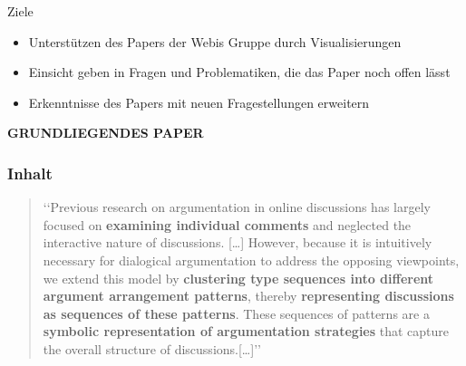 \documentclass[compress,12pt]{beamer}
\begin{document}
    \begin{frame}{Ziele}
        \begin{itemize}
            \item Unterstützen des Papers der Webis Gruppe durch Visualisierungen
            \item Einsicht geben in Fragen und Problematiken, die das Paper noch offen lässt
            \item Erkenntnisse des Papers mit neuen Fragestellungen erweitern
        \end{itemize}
    \end{frame}

    \End


    \begin{frame}
        \centering
        \textbf{GRUNDLIEGENDES PAPER}
    \end{frame}

    \begin{frame}
        \frametitle{Inhalt}
        {\small
            \begin{quote}
                \lq\lq{}Previous research on argumentation in online discussions has largely focused on \textbf{examining individual comments} and neglected the interactive nature of discussions.
                [\ldots] However, because it is intuitively necessary for dialogical argumentation to address the opposing viewpoints, we extend this model by \textbf{clustering type sequences into different argument arrangement patterns}, thereby \textbf{representing discussions as sequences of these patterns}.
                These sequences of patterns are a \textbf{symbolic representation of argumentation strategies} that capture the overall structure of discussions.[\ldots]\rq\rq{}
            \end{quote}}
    \end{frame}
\end{document}
